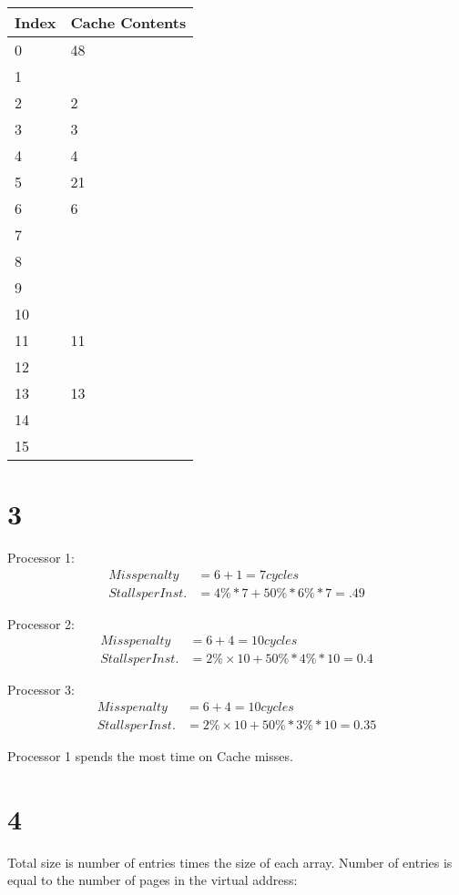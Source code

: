 \documentclass{article}
\begin{document}
\begin{tabular}{|l|l|}
\hline
Index & Cache Contents \\ \hline
0 & 48 \\ \hline
1 & \\ \hline
2 & 2 \\ \hline
3 & 3 \\ \hline
4 & 4 \\ \hline
5 & 21 \\ \hline
6 & 6 \\ \hline
7 & \\ \hline
8 & \\ \hline
9 & \\ \hline
10 & \\ \hline
11 & 11 \\ \hline
12 & \\ \hline
13 & 13 \\ \hline
14 & \\ \hline
15 & \\ \hline
\end{tabular}

\section*{3} 

Processor 1:
\begin{align*}
Miss penalty &= 6 + 1 = 7 cycles \\
Stalls per Inst. &= 4\% * 7 + 50\% * 6\% * 7 =.49
\end{align*}

Processor 2:
\begin{align*}
Miss penalty &= 6 + 4 = 10 cycles \\
Stalls per Inst. &= 2\% × 10 + 50\% * 4\% * 10 = 0.4
\end{align*}

Processor 3:
\begin{align*}
Miss penalty &= 6 + 4 = 10 cycles \\
Stalls per Inst. &= 2\% × 10 + 50\% * 3\% * 10 = 0.35
\end{align*}

Processor 1 spends the most time on Cache misses.

\section*{4}

Total size is number of entries times the size of each array. Number of entries is equal to the number of pages in the virtual address:
\end{document}
